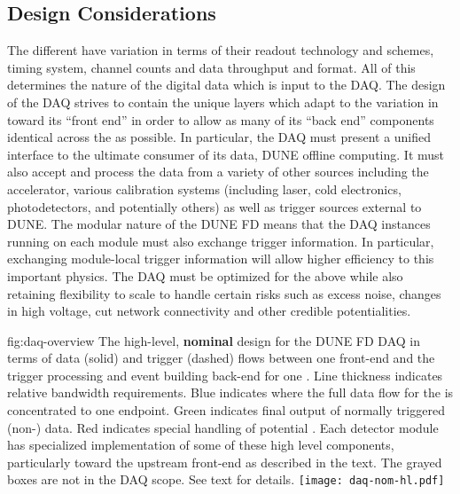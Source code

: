 \subsection{Design Considerations}
\label{sec:fd-daq-des-consid}

The different  have variation in terms of their
readout technology and schemes, timing system, channel counts and data
throughput and format.
All of this determines the nature of the digital data which is input
to the DAQ. 
The design of the DAQ strives to contain the unique layers which adapt
to the variation in  toward its ``front end'' in
order to allow as many of its ``back end'' components identical across
the  as possible. 
In particular, the DAQ must present a unified interface to the
ultimate consumer of its data, DUNE offline computing.
It must also accept and process the data from a variety of other
sources including the accelerator, various calibration systems
(including laser, cold electronics, photodetectors, and potentially
others) as well as trigger sources external to DUNE.
The modular nature of the DUNE FD means that the DAQ instances running
on each module must also exchange trigger information. 
In particular, exchanging module-local  trigger information
will allow higher efficiency to this important physics.
The DAQ must be optimized for the above while also retaining
flexibility to scale to handle certain risks such as excess noise,
changes in high voltage, cut network connectivity and other credible
potentialities.

\begin{dunefigure}{fig:daq-overview}
  {The high-level, \textbf{nominal} design for the DUNE FD DAQ in
    terms of data (solid) and trigger (dashed) flows between one
     front-end and the trigger processing and event
    building back-end for one . 
    Line thickness indicates relative bandwidth requirements.
    Blue indicates where the full data flow for the  is
    concentrated to one endpoint.
    Green indicates final output of normally triggered (non-) data.
    Red indicates special handling of potential . 
    Each detector module has specialized implementation of some of these
    high level components, particularly toward the upstream front-end
    as described in the text. 
    The grayed boxes are not in the DAQ scope.
    See text for details.
  }
  \texttt{[image: daq-nom-hl.pdf]}%
\end{dunefigure}

